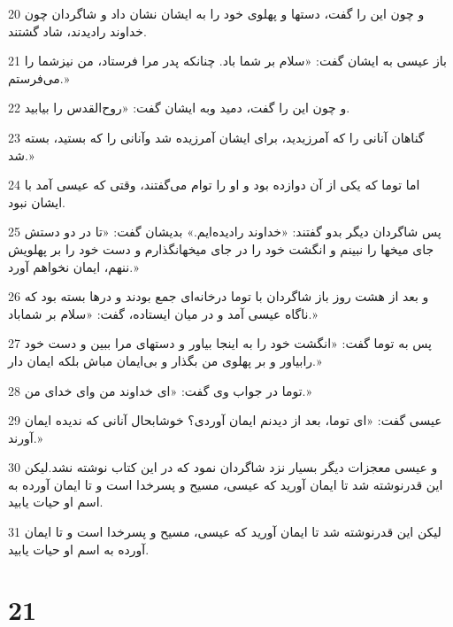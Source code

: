 \par 20 و چون این را گفت، دستها و پهلوی خود را به ایشان نشان داد و شاگردان چون خداوند رادیدند، شاد گشتند.
\par 21 باز عیسی به ایشان گفت: «سلام بر شما باد. چنانکه پدر مرا فرستاد، من نیزشما را می‌فرستم.»
\par 22 و چون این را گفت، دمید وبه ایشان گفت: «روح‌القدس را بیابید.
\par 23 گناهان آنانی را که آمرزیدید، برای ایشان آمرزیده شد وآنانی را که بستید، بسته شد.»
\par 24 اما توما که یکی از آن دوازده بود و او را توام می‌گفتند، وقتی که عیسی آمد با ایشان نبود.
\par 25 پس شاگردان دیگر بدو گفتند: «خداوند رادیده‌ایم.» بدیشان گفت: «تا در دو دستش جای میخها را نبینم و انگشت خود را در جای میخهانگذارم و دست خود را بر پهلویش ننهم، ایمان نخواهم آورد.»
\par 26 و بعد از هشت روز باز شاگردان با توما درخانه‌ای جمع بودند و درها بسته بود که ناگاه عیسی آمد و در میان ایستاده، گفت: «سلام بر شماباد.»
\par 27 پس به توما گفت: «انگشت خود را به اینجا بیاور و دستهای مرا ببین و دست خود رابیاور و بر پهلوی من بگذار و بی‌ایمان مباش بلکه ایمان دار.»
\par 28 توما در جواب وی گفت: «ای خداوند من و‌ای خدای من.»
\par 29 عیسی گفت: «ای توما، بعد از دیدنم ایمان آوردی؟ خوشابحال آنانی که ندیده ایمان آورند.»
\par 30 و عیسی معجزات دیگر بسیار نزد شاگردان نمود که در این کتاب نوشته نشد.لیکن این قدرنوشته شد تا ایمان آورید که عیسی، مسیح و پسرخدا است و تا ایمان آورده به اسم او حیات یابید.
\par 31 لیکن این قدرنوشته شد تا ایمان آورید که عیسی، مسیح و پسرخدا است و تا ایمان آورده به اسم او حیات یابید.

\chapter{21}

